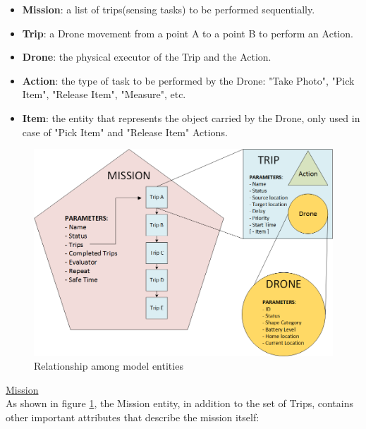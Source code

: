 \begin{itemize}
\itemsep2pt
\item{
\textbf{Mission}: a list of trips(sensing tasks) to be performed sequentially.
}
\item{
\textbf{Trip}: a Drone movement from a point A to a point B to perform an Action.
}
\item{
\textbf{Drone}: the physical executor of the Trip and the Action.
}
\item{
\textbf{Action}: the type of task to be performed by the Drone: "Take Photo", "Pick Item", "Release Item", "Measure", etc.
}
\item{
\textbf{Item}: the entity that represents the object carried by the Drone, only used in case of "Pick Item" and "Release Item" Actions.
}
\end{itemize}

\begin{figure}[htb]
  \centering
  \includegraphics[width=\linewidth]
  {pictures/EntityRelationship.png}
  \caption{Relationship among model entities}
  \label{fig:EntityRelationship}
\end{figure}

\newpage

\underline{Mission}
\\

As shown in figure \ref{fig:EntityRelationship}, the Mission entity, in addition to the set of Trips, contains other important attributes that describe the mission itself:

